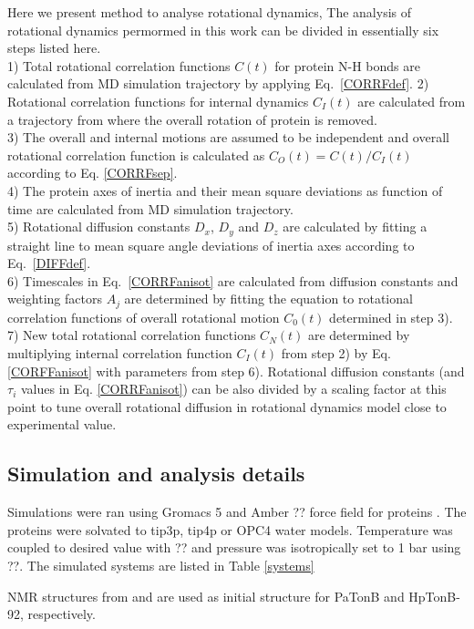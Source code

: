 \documentclass[pre,aps,floatfix,authordate1-4,twocolumn]{revtex4-1}
\begin{document}
Here we present method to analyse rotational dynamics,
The analysis of rotational dynamics permormed in this work can be
divided in essentially six steps listed here. \\
1) Total rotational correlation functions $C(t)$
for protein N-H bonds are calculated from MD simulation trajectory
by applying Eq.~\ref{CORRFdef}.
2) Rotational correlation functions for internal
dynamics $C_I(t)$ are calculated from a trajectory from where the overall
rotation of protein is removed. \\
3) The overall and internal motions are assumed to be independent and overall
rotational correlation function is calculated as $C_O(t)=C(t)/C_I(t)$ according to Eq. \ref{CORRFsep}. \\
4) The protein axes of inertia and their mean square deviations as function of
time are calculated from MD simulation trajectory. \\
5) Rotational diffusion constants $D_x$, $D_y$ and $D_z$ are calculated by fitting a straight line
to mean square angle deviations of inertia axes according to Eq.~\ref{DIFFdef}. \\
6) Timescales in Eq.~\ref{CORRFanisot} are calculated from diffusion constants and
weighting factors $A_j$ are determined by fitting the equation to
rotational correlation functions of overall rotational motion $C_0(t)$ determined in step 3). \\
7) New total rotational correlation functions $C_N(t)$ are determined by multiplying
internal correlation function $C_I(t)$ from step 2) by Eq. \ref{CORFFanisot} with
parameters from step 6). Rotational diffusion constants (and $\tau_i$ values in Eq. \ref{CORRFanisot})
can be also divided by a scaling factor at this point to tune overall
rotational diffusion in rotational dynamics model close to experimental value.



\subsection{Simulation and analysis details}
Simulations were ran using Gromacs 5 \cite{??} and Amber ?? 
force field for proteins \cite{??}. The proteins were solvated
to tip3p\cite{??}, tip4p \cite{??} or OPC4 \cite{??} water models.
Temperature was coupled to desired value with ?? and pressure was 
isotropically set to 1 bar using ??. The simulated systems are listed
in Table \ref{systems}

NMR structures from \cite{??} and \cite{??} are used as initial structure for 
PaTonB and HpTonB-92, respectively.
\end{document}
